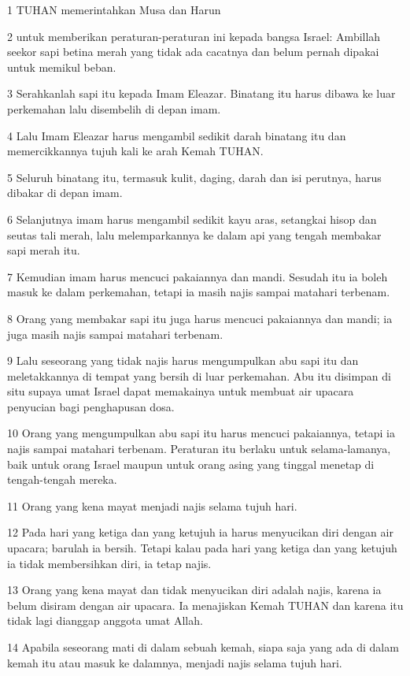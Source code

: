 \par 1 TUHAN memerintahkan Musa dan Harun
\par 2 untuk memberikan peraturan-peraturan ini kepada bangsa Israel: Ambillah seekor sapi betina merah yang tidak ada cacatnya dan belum pernah dipakai untuk memikul beban.
\par 3 Serahkanlah sapi itu kepada Imam Eleazar. Binatang itu harus dibawa ke luar perkemahan lalu disembelih di depan imam.
\par 4 Lalu Imam Eleazar harus mengambil sedikit darah binatang itu dan memercikkannya tujuh kali ke arah Kemah TUHAN.
\par 5 Seluruh binatang itu, termasuk kulit, daging, darah dan isi perutnya, harus dibakar di depan imam.
\par 6 Selanjutnya imam harus mengambil sedikit kayu aras, setangkai hisop dan seutas tali merah, lalu melemparkannya ke dalam api yang tengah membakar sapi merah itu.
\par 7 Kemudian imam harus mencuci pakaiannya dan mandi. Sesudah itu ia boleh masuk ke dalam perkemahan, tetapi ia masih najis sampai matahari terbenam.
\par 8 Orang yang membakar sapi itu juga harus mencuci pakaiannya dan mandi; ia juga masih najis sampai matahari terbenam.
\par 9 Lalu seseorang yang tidak najis harus mengumpulkan abu sapi itu dan meletakkannya di tempat yang bersih di luar perkemahan. Abu itu disimpan di situ supaya umat Israel dapat memakainya untuk membuat air upacara penyucian bagi penghapusan dosa.
\par 10 Orang yang mengumpulkan abu sapi itu harus mencuci pakaiannya, tetapi ia najis sampai matahari terbenam. Peraturan itu berlaku untuk selama-lamanya, baik untuk orang Israel maupun untuk orang asing yang tinggal menetap di tengah-tengah mereka.
\par 11 Orang yang kena mayat menjadi najis selama tujuh hari.
\par 12 Pada hari yang ketiga dan yang ketujuh ia harus menyucikan diri dengan air upacara; barulah ia bersih. Tetapi kalau pada hari yang ketiga dan yang ketujuh ia tidak membersihkan diri, ia tetap najis.
\par 13 Orang yang kena mayat dan tidak menyucikan diri adalah najis, karena ia belum disiram dengan air upacara. Ia menajiskan Kemah TUHAN dan karena itu tidak lagi dianggap anggota umat Allah.
\par 14 Apabila seseorang mati di dalam sebuah kemah, siapa saja yang ada di dalam kemah itu atau masuk ke dalamnya, menjadi najis selama tujuh hari.
